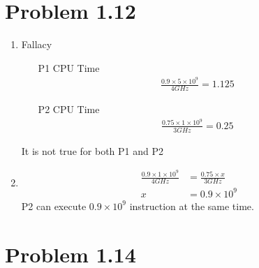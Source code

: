 \documentclass{article}
\def\math#1{$#1$}
\begin{document}
\section{Problem 1.12}
\begin{enumerate}[(1)]
    \item Fallacy
        \begin{itemize}
            \item [P1 CPU Time]
             \begin{equation}
                    \begin{split}
                       \frac{0.9 \times 5 \times 10^9}{4GHz} = 1.125
                    \end{split}
                \end{equation}
            \item [P2 CPU Time]
                \begin{equation}
                    \begin{split}
                       \frac{0.75 \times 1 \times 10^9}{3GHz} = 0.25
                    \end{split}
                \end{equation}
        \end{itemize}
        It is not true for both P1 and P2
    \item  \begin{equation}
                \begin{split}
                   \frac{0.9 \times 1 \times 10^9}{4GHz} &= \frac{0.75 \times x}{3GHz} \\
                   x &= 0.9 \times 10^9
                \end{split}
            \end{equation}
            P2 can execute \math{0.9 \times 10^9} instruction at the same time.
\end{enumerate}

\section{Problem 1.14}
\end{document}

